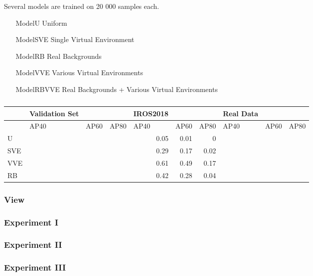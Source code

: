 Several models are trained on 20 000 samples each.
\begin{itemize}
	\item[ModelU] Uniform
	\item[ModelSVE] Single Virtual Environment
	\item[ModelRB] Real Backgrounds
	\item[ModelVVE] Various Virtual Environments
	\item[ModelRBVVE] Real Backgrounds + Various Virtual Environments
\end{itemize}


\begin{table}[htbp]
	\caption{}
	\begin{tabular}{|l|l|l|l|r|r|r|l|l|l|}
		\hline
		& Validation Set &  &  & \multicolumn{1}{l|}{IROS2018} & \multicolumn{1}{l|}{} & \multicolumn{1}{l|}{} & Real Data &  &  \\ \hline
		& AP40 & AP60 & AP80 & \multicolumn{1}{l|}{AP40} & \multicolumn{1}{l|}{AP60} & \multicolumn{1}{l|}{AP80} & AP40 & AP60 & AP80 \\ \hline
		U &  &  &  & 0.05 & 0.01 & 0 &  &  &  \\ \hline
		SVE &  &  &  & 0.29 & 0.17 & 0.02 &  &  &  \\ \hline
		VVE &  &  &  & 0.61 & 0.49 & 0.17 &  &  &  \\ \hline
		RB &  &  &  & 0.42 & 0.28 & 0.04 &  &  &  \\ \hline
	\end{tabular}
	\label{tab:env}
\end{table}


\subsubsection{View}



\subsubsection{Experiment I}


\subsubsection{Experiment II}



\subsubsection{Experiment III}

